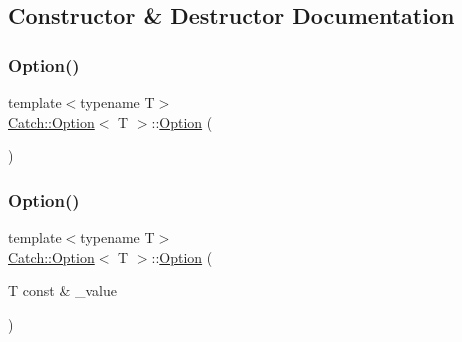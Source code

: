 \subsection{Constructor \& Destructor Documentation}
\hypertarget{class_catch_1_1_option_a8efb01b593d798decc80cbbdf311f2a3}{}\label{class_catch_1_1_option_a8efb01b593d798decc80cbbdf311f2a3} 
\subsubsection{\texorpdfstring{Option()}{Option()}\hspace{0.1cm}{\footnotesize\ttfamily [1/3]}}
{\footnotesize\ttfamily template$<$typename T$>$ \\
\hyperlink{class_catch_1_1_option}{Catch\+::\+Option}$<$ T $>$\+::\hyperlink{class_catch_1_1_option}{Option} (\begin{DoxyParamCaption}{ }\end{DoxyParamCaption})\hspace{0.3cm}{\ttfamily [inline]}}

\hypertarget{class_catch_1_1_option_a5aeb9c22d48a6882bdf5fb4730b06c86}{}\label{class_catch_1_1_option_a5aeb9c22d48a6882bdf5fb4730b06c86} 
\subsubsection{\texorpdfstring{Option()}{Option()}\hspace{0.1cm}{\footnotesize\ttfamily [2/3]}}
{\footnotesize\ttfamily template$<$typename T$>$ \\
\hyperlink{class_catch_1_1_option}{Catch\+::\+Option}$<$ T $>$\+::\hyperlink{class_catch_1_1_option}{Option} (\begin{DoxyParamCaption}\item[{T const \&}]{\+\_\+value }\end{DoxyParamCaption})\hspace{0.3cm}{\ttfamily [inline]}}

\hypertarget{class_catch_1_1_option_af02f2e4559f06384baec0def8c68c5fd}{}\label{class_catch_1_1_option_af02f2e4559f06384baec0def8c68c5fd} 
